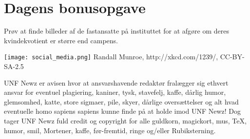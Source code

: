 \begin{minipage}[b]{0.95\linewidth}
\begin{minipage}[t]{0.47\textwidth}
\section*{Dagens bonusopgave}
Prøv at finde billeder af de fastansatte på instituttet for at afgøre om deres kvindekvotient er større end campens.

\end{minipage}

\begin{center}
\texttt{[image: social\_media.png]}
\tiny Randall Munroe, http://xkcd.com/1239/, CC-BY-SA-2.5

\tiny UNF Newz er avisen hvor at ansvarshavende redaktør fralægger sig ethvert ansvar for eventuel plagiering, kaniner, tysk, stavefelj, kaffe, dårlig humor, glemsomhed, katte, store sigmaer, pile, skyer, dårlige oversættelser og alt hvad eventuelle homo sapiens sapiens kunne finde på at holde imod UNF Newz! Dog tager UNF Newz fuld credit og copyright for alle guldkorn, magickort, mus, \TeX, humor, smil, Mortener, kaffe, før-fremtid, ringe og/eller Rubiksterning.
\end{center}
\end{minipage}

